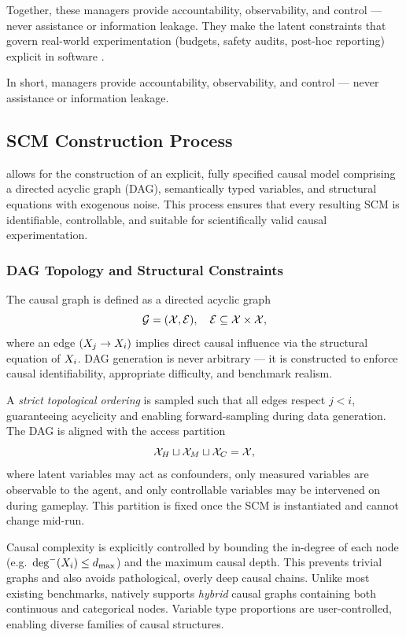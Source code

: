 Together, these managers provide accountability, observability, and control — never assistance or information leakage. They make the latent constraints that govern real-world experimentation (budgets, safety audits, post-hoc reporting) explicit in software \citep{Prosperi2020CausalIAA,ACCBench2024}.

In short, managers provide accountability, observability, and control — never assistance or information leakage.

\subsection{SCM Construction Process}
\game allows for the construction of an explicit, fully specified causal model comprising a directed acyclic graph (DAG), semantically typed variables, and structural equations with exogenous noise. This process ensures that every resulting SCM is identifiable, controllable, and suitable for scientifically valid causal experimentation.

\subsubsection{DAG Topology and Structural Constraints}
The causal graph is defined as a directed acyclic graph
\[
    \DAG = (\varset, \edgesset), \quad \edgesset \subseteq \varset \times \varset,
\]
where an edge $(X_j \to X_i)$ implies direct causal influence via the structural equation of $X_i$.  
DAG generation is never arbitrary — it is constructed to enforce causal identifiability, appropriate difficulty, and benchmark realism.

A \emph{strict topological ordering} is sampled such that all edges respect $j < i$, guaranteeing acyclicity and enabling forward-sampling during data generation.  
The DAG is aligned with the access partition
\[
    \mathcal{X}_H \sqcup \mathcal{X}_M \sqcup \mathcal{X}_C = \mathcal{X},
\]
where latent variables may act as confounders, only measured variables are observable to the agent, and only controllable variables may be intervened on during gameplay. This partition is fixed once the SCM is instantiated and cannot change mid-run.

Causal complexity is explicitly controlled by bounding the in-degree of each node (e.g.\ $\deg^-(X_i) \le d_{\max}$) and the maximum causal depth. This prevents trivial graphs and also avoids pathological, overly deep causal chains.  
Unlike most existing benchmarks, \game natively supports \emph{hybrid} causal graphs containing both continuous and categorical nodes. Variable type proportions are user-controlled, enabling diverse families of causal structures.

